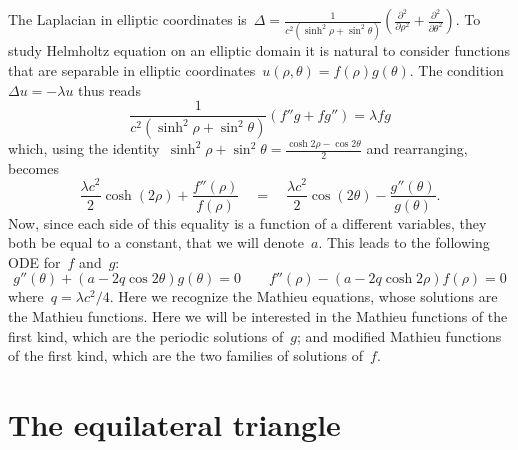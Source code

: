 The Laplacian in elliptic coordinates
is~$\displaystyle\Delta=
\frac1{c^2\left(\sinh^2\rho+\sin^2\theta\right)}
\left(
	\frac{\partial^2}{\partial\rho^2}
	+
	\frac{\partial^2}{\partial\theta^2}
\right)
$.
To study Helmholtz equation on an elliptic domain it is natural to
consider functions that are separable in elliptic
coordinates~$u(\rho,\theta)=f(\rho)g(\theta)$.  The condition~$\Delta
u=-\lambda u$ thus reads
\[
\frac1{c^2\left(\sinh^2\rho+\sin^2\theta\right)}
\left(f''g+fg''\right)
=\lambda fg
\]
which, using the
identity~$\sinh^2\rho+\sin^2\theta=\frac{\cosh{2\rho}-\cos{2\theta}}2$
and
rearranging, becomes
\[
	\frac{\lambda c^2}2\cosh(2\rho)
	+
	\frac{f''(\rho)}{f(\rho)}
	\quad = \quad
	\frac{\lambda c^2}2\cos(2\theta)
	-\frac{g''(\theta)}{g(\theta)}.
\]
Now,
since each side of this equality is a function of a different
variables, they both be equal to a constant, that we will denote~$a$.
This leads to the following ODE for~$f$ and~$g$:
\begin{equation}\label{eq:mathieuell}
	g''(\theta)+\left(a-2q\cos2\theta\right)g(\theta)=0
	\qquad
	f''(\rho)-\left(a-2q\cosh2\rho\right)f(\rho)=0
\end{equation}
where~$q=\lambda c^2/4$.  Here we recognize the Mathieu
equations, whose solutions are the Mathieu functions.  Here we will
be interested in the Mathieu functions of the first kind, which are
the periodic solutions of~$g$; and modified Mathieu functions of the
first kind, which are the two families of solutions of~$f$.



\section{The equilateral triangle}

